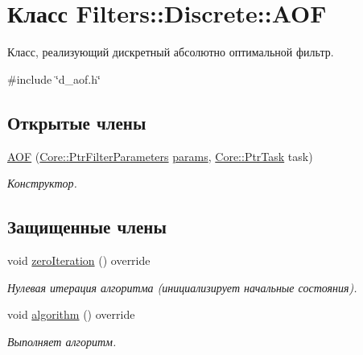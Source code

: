 \hypertarget{class_filters_1_1_discrete_1_1_a_o_f}{}\section{Класс Filters\+:\+:Discrete\+:\+:A\+OF}
\label{class_filters_1_1_discrete_1_1_a_o_f}


Класс, реализующий дискретный абсолютно оптимальной фильтр.  




{\ttfamily \#include \char`\"{}d\+\_\+aof.\+h\char`\"{}}

\subsection*{Открытые члены}
\begin{DoxyCompactItemize}
\item 
\hyperlink{class_filters_1_1_discrete_1_1_a_o_f_a2df66ff12a7b327da999b0fd1dc82759}{A\+OF} (\hyperlink{namespace_core_a4811af8148ba137d644b9a61a042cf03}{Core\+::\+Ptr\+Filter\+Parameters} \hyperlink{class_core_1_1_filter_a44aa749b49ba46256975ce545531ecf7}{params}, \hyperlink{namespace_core_abfda8f69fcacfcea2696549b548ed737}{Core\+::\+Ptr\+Task} task)\hypertarget{class_filters_1_1_discrete_1_1_a_o_f_a2df66ff12a7b327da999b0fd1dc82759}{}\label{class_filters_1_1_discrete_1_1_a_o_f_a2df66ff12a7b327da999b0fd1dc82759}

\begin{DoxyCompactList}\small\item\em Конструктор. \end{DoxyCompactList}\end{DoxyCompactItemize}
\subsection*{Защищенные члены}
\begin{DoxyCompactItemize}
\item 
void \hyperlink{class_filters_1_1_discrete_1_1_a_o_f_aa822fe74d7ca160f898db1c1289e17f7}{zero\+Iteration} () override
\begin{DoxyCompactList}\small\item\em Нулевая итерация алгоритма (инициализирует начальные состояния). \end{DoxyCompactList}\item 
void \hyperlink{class_filters_1_1_discrete_1_1_a_o_f_a22cbbf1054a17045c5e91ed7c5cba387}{algorithm} () override
\begin{DoxyCompactList}\small\item\em Выполняет алгоритм. \end{DoxyCompactList}\end{DoxyCompactItemize}
